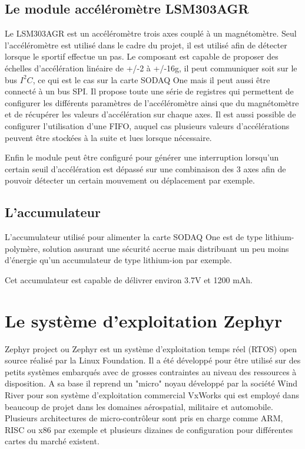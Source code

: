 
\subsection{Le module accéléromètre LSM303AGR}\label{ch:module_lsm303agr}


Le LSM303AGR est un accéléromètre trois axes couplé à un magnétomètre. Seul l'accéléromètre est utilisé dans le cadre du projet, il est utilisé afin de détecter lorsque le sportif effectue un pas. Le composant est capable de proposer des échelles d'accélération linéaire de +/-2 à +/-16g, il peut communiquer soit sur le bus $I^{2}C$, ce qui est le cas sur la carte SODAQ One mais il peut aussi être connecté à un bus SPI. Il propose toute une série de registres qui permettent de configurer les différents paramètres de l'accéléromètre ainsi que du magnétomètre et de récupérer les valeurs d'accélération sur chaque axes. Il est aussi possible de configurer l'utilisation d'une FIFO, auquel cas plusieurs valeurs d'accélérations peuvent être stockées à la suite et lues lorsque nécessaire.

Enfin le module peut être configuré pour générer une interruption lorsqu'un certain seuil d'accélération est dépassé sur une combinaison des 3 axes afin de pouvoir détecter un certain mouvement ou déplacement par exemple. 

\subsection{L'accumulateur}


L'accumulateur utilisé pour alimenter la carte SODAQ One est de type lithium-polymère, solution assurant une sécurité accrue mais distribuant un peu moins d'énergie qu'un accumulateur de type lithium-ion par exemple.

Cet accumulateur est capable de délivrer environ 3.7V et 1200 mAh.


\section{Le système d'exploitation Zephyr}

Zephyr project ou Zephyr est un système d'exploitation temps réel (RTOS) open source réalisé par la Linux Foundation. Il a été développé pour être utilisé sur des petits systèmes embarqués avec de grosses contraintes au niveau des ressources à disposition. A sa base il reprend un "micro" noyau développé par la société Wind River pour son système d'exploitation commercial VxWorks qui est employé dans beaucoup de projet dans les domaines aérospatial, militaire et automobile.
Plusieurs architectures de micro-contrôleur sont pris en charge comme ARM, RISC ou x86 par exemple et plusieurs dizaines de configuration pour différentes cartes du marché existent. 

